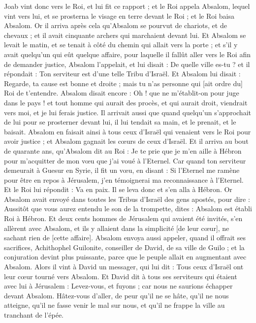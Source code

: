 \begin{multicols}{2}
Joab vint donc vers le Roi, et lui fit ce rapport ; et le Roi appela Absalom, lequel vint vers lui, et se prosterna le visage en terre devant le Roi ; et le Roi baisa Absalom.
\VerseOne{}Or il arriva après cela qu'Absalom se pourvut de chariots, et de chevaux ; et il avait cinquante archers qui marchaient devant lui.
Et Absalom se levait le matin, et se tenait à côté du chemin qui allait vers la porte ; et s'il y avait quelqu'un qui eût quelque affaire, pour laquelle il fallût aller vers le Roi afin de demander justice, Absalom l'appelait, et lui disait : De quelle ville es-tu ? et il répondait : Ton serviteur est d'une telle Tribu d'Israël.
Et Absalom lui disait : Regarde, ta cause est bonne et droite ; mais tu n'as personne qui [ait ordre du] Roi de t'entendre.
Absalom disait encore : Oh ! que ne m'établit-on pour juge dans le pays ! et tout homme qui aurait des procès, et qui aurait droit, viendrait vers moi, et je lui ferais justice.
Il arrivait aussi que quand quelqu'un s'approchait de lui pour se prosterner devant lui, il lui tendait sa main, et le prenait, et le baisait.
Absalom en faisait ainsi à tous ceux d'Israël qui venaient vers le Roi pour avoir justice ; et Absalom gagnait les cœurs de ceux d'Israël.
Et il arriva au bout de quarante ans, qu'Absalom dit au Roi : Je te prie que je m'en aille à Hébron pour m'acquitter de mon vœu que j'ai voué à l'Eternel.
Car quand ton serviteur demeurait à Guesur en Syrie, il fit un vœu, en disant : Si l'Eternel me ramène pour être en repos à Jérusalem, j'en témoignerai ma reconnaissance à l'Eternel.
Et le Roi lui répondit : Va en paix. Il se leva donc et s'en alla à Hébron.
Or Absalom avait envoyé dans toutes les Tribus d'Israël des gens apostés, pour dire : Aussitôt que vous aurez entendu le son de la trompette, dites : Absalom est établi Roi à Hébron.
Et deux cents hommes de Jérusalem qui avaient été invités, s'en allèrent avec Absalom, et ils y allaient dans la simplicité [de leur cœur], ne sachant rien de [cette affaire].
Absalom envoya aussi appeler, quand il offrait ses sacrifices, Achithophel Guilonite, conseiller de David, de sa ville de Guilo ; et la conjuration devint plus puissante, parce que le peuple allait en augmentant avec Absalom.
Alors il vint à David un messager, qui lui dit : Tous ceux d'Israël ont leur cœur tourné vers Absalom.
Et David dit à tous ses serviteurs qui étaient avec lui à Jérusalem : Levez-vous, et fuyons ; car nous ne saurions échapper devant Absalom. Hâtez-vous d'aller, de peur qu'il ne se hâte, qu'il ne nous atteigne, qu'il ne fasse venir le mal sur nous, et qu'il ne frappe la ville au tranchant de l'épée.

\end{multicols}
